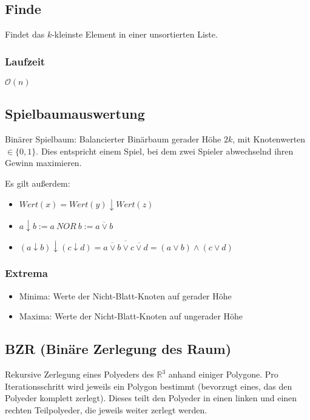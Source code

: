 \subsection{Finde}
Findet das \(k\)-kleinste Element in einer unsortierten Liste.
\text{}\\


\subsubsection{Laufzeit}
\(\mathcal{O}(n)\)

\subsection{Spielbaumauswertung}
Binärer Spielbaum: Balancierter Binärbaum gerader Höhe \(2k\), mit Knotenwerten \(\in \{0,1\}\). Dies entspricht einem Spiel, bei dem zwei Spieler abwechselnd ihren Gewinn maximieren.

Es gilt außerdem:
\begin{itemize}
	\item \(Wert(x) = Wert(y) \downarrow Wert(z)\)
	\item \(a \downarrow b := a~NOR~b := \overline{a \vee b}\)
	\item \((a \downarrow b) \downarrow (c \downarrow d) = \overline{\overline{a \vee b} \vee \overline{c \vee d}} = (a \vee b) \wedge (c \vee d)\)
\end{itemize}

\subsubsection{Extrema}
\begin{itemize}
	\item Minima: Werte der Nicht-Blatt-Knoten auf gerader Höhe
	\item Maxima: Werte der Nicht-Blatt-Knoten auf ungerader Höhe
\end{itemize}




\subsection{BZR (Binäre Zerlegung des Raum)}
Rekursive Zerlegung eines Polyeders des \(\mathbb{R}^3\) anhand einiger Polygone. Pro Iterationsschritt wird jeweils ein Polygon bestimmt (bevorzugt eines, das den Polyeder komplett zerlegt). Dieses teilt den Polyeder in einen linken und einen rechten Teilpolyeder, die jeweils weiter zerlegt werden.
\text{}\\



